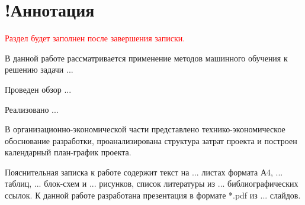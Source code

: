 \section*{!Аннотация}
\textcolor{red}{Раздел будет заполнен после завершения записки.}

В данной работе рассматривается применение методов машинного обучения к решению задачи ...

Проведен обзор ...

Реализовано ...

В организационно-экономической части представлено технико-экономическое обоснование разработки, проанализирована структура затрат проекта и построен календарный план-график проекта.

Пояснительная записка к работе содержит текст на ... листах формата А4, ... таблиц, ... блок-схем и ... рисунков, список литературы из ... библиографических ссылок. К данной работе разработана презентация в формате *.pdf из ... слайдов.
